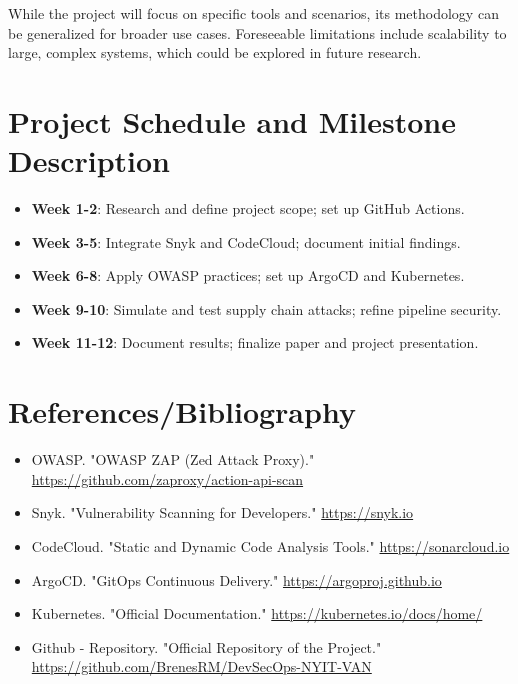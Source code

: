 \documentclass[a4paper,12pt]{article}
\begin{document}
While the project will focus on specific tools and scenarios, its methodology can be generalized for broader use cases. Foreseeable limitations include scalability to large, complex systems, which could be explored in future research.

\section{Project Schedule and Milestone Description}
\begin{itemize}
    \item \textbf{Week 1-2}: Research and define project scope; set up GitHub Actions.
    \item \textbf{Week 3-5}: Integrate Snyk and CodeCloud; document initial findings.
    \item \textbf{Week 6-8}: Apply OWASP practices; set up ArgoCD and Kubernetes.
    \item \textbf{Week 9-10}: Simulate and test supply chain attacks; refine pipeline security.
    \item \textbf{Week 11-12}: Document results; finalize paper and project presentation.
\end{itemize}

\section{References/Bibliography}
\begin{itemize}
    \item OWASP. "OWASP ZAP (Zed Attack Proxy)." \url{https://github.com/zaproxy/action-api-scan}
    \item Snyk. "Vulnerability Scanning for Developers." \url{https://snyk.io}
    \item CodeCloud. "Static and Dynamic Code Analysis Tools." \url{https://sonarcloud.io}
    \item ArgoCD. "GitOps Continuous Delivery." \url{https://argoproj.github.io}
    \item Kubernetes. "Official Documentation." \url{https://kubernetes.io/docs/home/}
    \item Github - Repository. "Official Repository of the Project." \url{https://github.com/BrenesRM/DevSecOps-NYIT-VAN}
\end{itemize}
\end{document}
